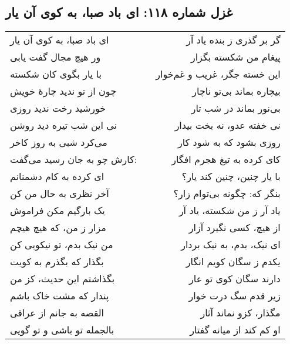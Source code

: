 \begin{center}
\section*{غزل شماره ۱۱۸: ای باد صبا، به کوی آن یار}
\label{sec:118}
\begin{longtable}{l p{0.5cm} r}
ای باد صبا، به کوی آن یار
&&
گر بر گذری ز بنده یاد آر
\\
ور هیچ مجال گفت یابی
&&
پیغام من شکسته بگزار
\\
با یار بگوی کان شکسته
&&
این خسته جگر، غریب و غم‌خوار
\\
چون از تو ندید چارهٔ خویش
&&
بیچاره بماند بی‌تو ناچار
\\
خورشید رخت ندید روزی
&&
بی‌نور بماند در شب تار
\\
نی این شب تیره دید روشن
&&
نی خفته عدو، نه بخت بیدار
\\
می‌کرد شبی به روز کاخر
&&
روزی بشود که به شود کار
\\
کارش چو به جان رسید می‌گفت:
&&
کای کرده به تیغ هجرم افگار
\\
ای کرده به کام دشمنانم
&&
با یار چنین، چنین کند یار؟
\\
آخر نظری به حال من کن
&&
بنگر که: چگونه بی‌توام زار؟
\\
یک بارگیم مکن فراموش
&&
یاد آر ز من شکسته، یاد آر
\\
مزار ز من، که هیچ هیچم
&&
از هیچ، کسی نگیرد آزار
\\
من نیک بدم، تو نیکویی کن
&&
ای نیک، بدم، به نیک بردار
\\
بگذار که بگذرم به کویت
&&
یکدم ز سگان کویم انگار
\\
بگذاشتم این حدیث، کز من
&&
دارند سگان کوی تو عار
\\
پندار که مشت خاک باشم
&&
زیر قدم سگ درت خوار
\\
القصه به جانم از عراقی
&&
مگذار، کزو نماند آثار
\\
بالجمله تو باشی و تو گویی
&&
او کم کند از میانه گفتار
\\
\end{longtable}
\end{center}
